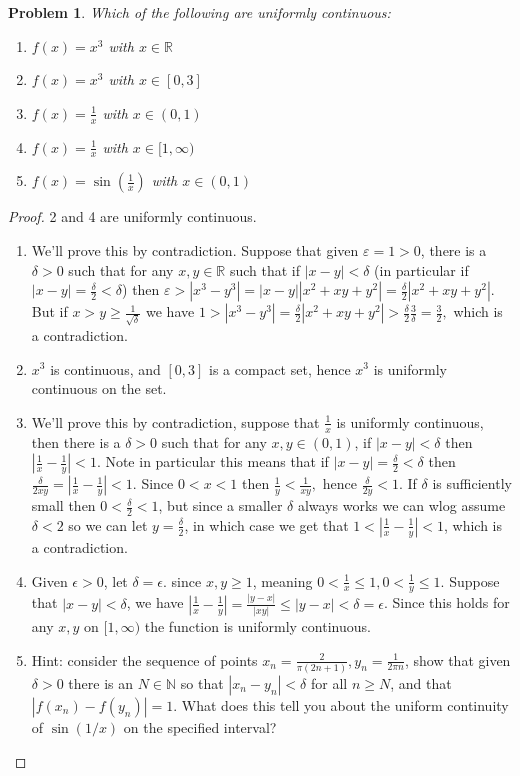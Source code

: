 \documentclass[11pt]{article}
\theoremstyle{plain}
\newtheorem{problem}{Problem}
\theoremstyle{remark}
\newcommand {\mbR} {\mathbb R}
\newcommand {\mbN} {\mathbb N}
\newcommand {\eps} {\varepsilon}
\newcommand {\del} {\delta}
\begin{document}
	\begin{problem}
		Which of the following are uniformly continuous:
		
		\begin{enumerate}
			\item $f(x)=x^3$ with $x\in\mbR$
			\item $f(x)=x^3$ with $x\in [0,3]$
			\item $f(x)=\frac{1}{x}$ with $x\in(0,1)$
			\item $f(x)=\frac 1 x$ with $x\in [1,\infty)$
			\item $f(x)=\sin\left(\frac 1 x\right)$ with $x\in (0,1)$
		\end{enumerate}
	\end{problem}

	\begin{proof}
	2 and 4 are uniformly continuous. 
	\begin{enumerate}
		\item We'll prove this by contradiction. Suppose that given $\eps=1>0$, there is a $\del>0$ such that for any $x,y\in \mbR$ such that if $|x-y|<\del$ (in particular if $|x-y|=\frac \del 2<\del$) then $\eps>|x^3-y^3|=|x-y||x^2+xy+y^2|=\frac \del 2 |x^2+xy+y^2|$. But if $x>y\geq \frac 1 {\sqrt{\del}}$ we have $1>|x^3-y^3|=\frac \del 2 |x^2+xy+y^2| > \frac \del 2 \frac 3 \del = \frac 3 2,$ which is a contradiction.
		\item $x^3$ is continuous, and $[0,3]$ is a compact set, hence $x^3$ is uniformly continuous on the set.		
		\item We'll prove this by contradiction, suppose that $\frac 1 x$ is uniformly continuous, then there is a $\delta>0$ such that for any $x,y\in(0,1)$, if $|x-y|<\delta$ then $|\frac 1 x - \frac 1 y|<1$. Note in particular this means that if $|x-y|=\frac \delta 2 < \delta$ then $\frac{\delta}{2xy}=|\frac{1}{x}-\frac{1}{y}|<1$. Since $0<x<1$ then $\frac 1 y<\frac 1 {xy},$ hence $\frac{\delta}{2y}<1.$ If $\delta$ is sufficiently small then $0<\frac \delta 2<1$, but since a smaller $\del$ always works we can wlog assume $\del <2$ so we can let $y=\frac \delta 2$, in which case we get that $1<|\frac{1}{x}-\frac{1}{y}|<1$, which is a contradiction. 
		\item Given $\epsilon>0$, let $\delta=\epsilon$. since $x,y\geq 1$, meaning $0<\frac{1}{x}\leq 1,0<\frac 1 y \leq 1$. Suppose that $|x-y|<\delta$, we have $|\frac{1}{x}-\frac 1 y|=\frac{|y-x|}{|xy|}\leq |y-x|<\delta=\epsilon$. Since this holds for any $x,y$ on $[1,\infty)$ the function is uniformly continuous.
		\item Hint: consider the sequence of points $x_n=\frac{2}{\pi(2n+1)},y_n=\frac{1}{2\pi n}$, show that given $\delta>0$ there is an $N\in \mbN$ so that $|x_n-y_n|<\delta$ for all $n\geq N$, and that $|f(x_n)-f(y_n)|=1$. What does this tell you about the uniform continuity of $\sin(1/x)$ on the specified interval?
	\end{enumerate}
\end{proof}
\end{document}
